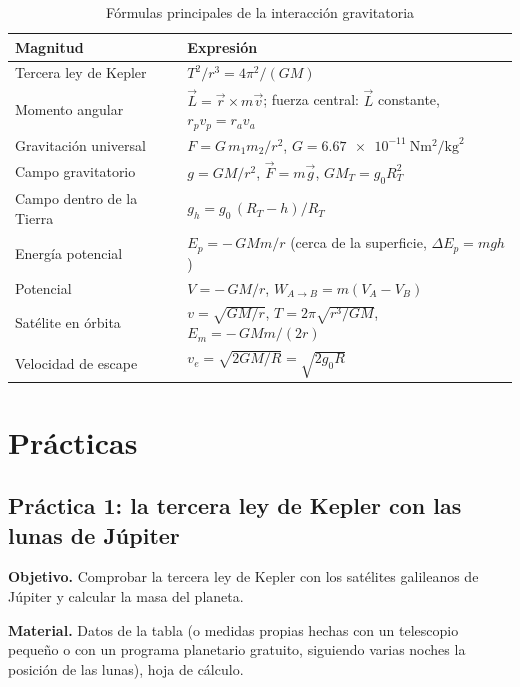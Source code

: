 \begin{table}[H]
    \centering
    \caption{Fórmulas principales de la interacción gravitatoria}
    \vspace{-5pt}
    \begin{tabular}{@{}lL{10cm}@{}}
        \toprule
        \textbf{Magnitud} & \textbf{Expresión} \\
        \midrule
        Tercera ley de Kepler & \(T^2/r^3 = 4\pi^2/(GM)\) \\[3pt]
        Momento angular & \(\vec L = \vec r\times m\vec v\); \quad fuerza central: \(\vec L\) constante, \(r_p v_p = r_a v_a\) \\[3pt]
        Gravitación universal & \(F = G\,m_1 m_2/r^2\), \quad \(G = \qty{6.67e-11}{\newton\m\squared\per\kg\squared}\) \\[3pt]
        Campo gravitatorio & \(g = GM/r^2\), \quad \(\vec F = m\vec g\), \quad \(G M_T = g_0 R_T^2\) \\[3pt]
        Campo dentro de la Tierra & \(g_h = g_0\,(R_T - h)/R_T\) \\[3pt]
        Energía potencial & \(E_p = -\,GMm/r\) \quad (cerca de la superficie, \(\Delta E_p = mgh\)) \\[3pt]
        Potencial & \(V = -\,GM/r\), \quad \(W_{A\to B} = m(V_A - V_B)\) \\[3pt]
        Satélite en órbita & \(v = \sqrt{GM/r}\), \quad \(T = 2\pi\sqrt{r^3/GM}\), \quad \(E_m = -\,GMm/(2r)\) \\[3pt]
        Velocidad de escape & \(v_e = \sqrt{2GM/R} = \sqrt{2 g_0 R}\) \\
        \bottomrule
    \end{tabular}
    \label{tab:grav-resumen}
\end{table}

\section{Prácticas}\label{sec:grav-practicas}

\subsection{Práctica 1: la tercera ley de Kepler con las lunas de Júpiter}\label{subsec:grav-practica-kepler}

\textbf{Objetivo.} Comprobar la tercera ley de Kepler con los satélites galileanos de Júpiter y calcular la masa del planeta.

\textbf{Material.} Datos de la tabla (o medidas propias hechas con un telescopio pequeño o con un programa planetario
gratuito, siguiendo varias noches la posición de las lunas), hoja de cálculo.


